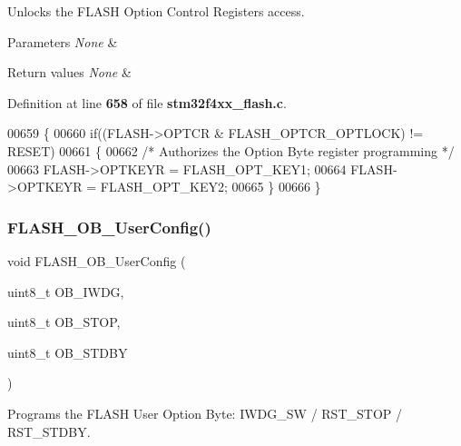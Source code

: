 Unlocks the F\+L\+A\+SH Option Control Registers access. 


\begin{DoxyParams}{Parameters}
{\em None} & \\
\hline
\end{DoxyParams}

\begin{DoxyRetVals}{Return values}
{\em None} & \\
\hline
\end{DoxyRetVals}


Definition at line \textbf{ 658} of file \textbf{ stm32f4xx\+\_\+flash.\+c}.


\begin{DoxyCode}
00659 \{
00660   \textcolor{keywordflow}{if}((FLASH->OPTCR & FLASH_OPTCR_OPTLOCK) != RESET)
00661   \{
00662     \textcolor{comment}{/* Authorizes the Option Byte register programming */}
00663     FLASH->OPTKEYR = FLASH_OPT_KEY1;
00664     FLASH->OPTKEYR = FLASH_OPT_KEY2;
00665   \}  
00666 \}
\end{DoxyCode}
\mbox{\label{group__FLASH_ga6b605409e4271b4cc6dfb56ed8108a1a}} 
\subsubsection{F\+L\+A\+S\+H\+\_\+\+O\+B\+\_\+\+User\+Config()}
{\footnotesize\ttfamily void F\+L\+A\+S\+H\+\_\+\+O\+B\+\_\+\+User\+Config (\begin{DoxyParamCaption}\item[{uint8\+\_\+t}]{O\+B\+\_\+\+I\+W\+DG,  }\item[{uint8\+\_\+t}]{O\+B\+\_\+\+S\+T\+OP,  }\item[{uint8\+\_\+t}]{O\+B\+\_\+\+S\+T\+D\+BY }\end{DoxyParamCaption})}



Programs the F\+L\+A\+SH User Option Byte\+: I\+W\+D\+G\+\_\+\+SW / R\+S\+T\+\_\+\+S\+T\+OP / R\+S\+T\+\_\+\+S\+T\+D\+BY. 


